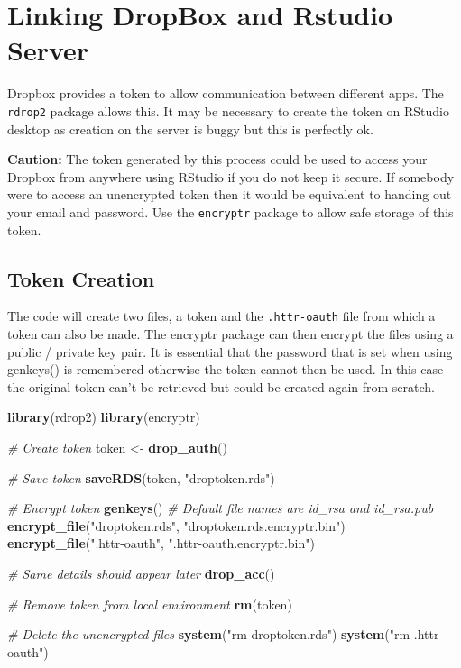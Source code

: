 \documentclass[]{book}
\newenvironment{Shaded}{\begin{snugshade}}{\end{snugshade}}
\newcommand{\CommentTok}[1]{\textcolor[rgb]{0.56,0.35,0.01}{\textit{#1}}}
\newcommand{\KeywordTok}[1]{\textcolor[rgb]{0.13,0.29,0.53}{\textbf{#1}}}
\newcommand{\NormalTok}[1]{#1}
\newcommand{\StringTok}[1]{\textcolor[rgb]{0.31,0.60,0.02}{#1}}
\begin{document}
\hypertarget{linking-dropbox-and-rstudio-server}{%
\section{Linking DropBox and Rstudio Server}\label{linking-dropbox-and-rstudio-server}}

Dropbox provides a token to allow communication between different apps. The \texttt{rdrop2} package allows this. It may be necessary to create the token on RStudio desktop as creation on the server is buggy but this is perfectly ok.

\textbf{Caution:} The token generated by this process could be used to access your Dropbox from anywhere using RStudio if you do not keep it secure. If somebody were to access an unencrypted token then it would be equivalent to handing out your email and password. Use the \texttt{encryptr} package to allow safe storage of this token.

\hypertarget{token-creation}{%
\subsection{Token Creation}\label{token-creation}}

The code will create two files, a token and the \texttt{.httr-oauth} file from which a token can also be made. The encryptr package can then encrypt the files using a public / private key pair. It is essential that the password that is set when using genkeys() is remembered otherwise the token cannot then be used. In this case the original token can't be retrieved but could be created again from scratch.

\begin{Shaded}
\begin{Highlighting}[]
\KeywordTok{library}\NormalTok{(rdrop2)}
\KeywordTok{library}\NormalTok{(encryptr)}
 
\CommentTok{# Create token}
\NormalTok{token <-}\StringTok{ }\KeywordTok{drop_auth}\NormalTok{()}
 
\CommentTok{# Save token}
\KeywordTok{saveRDS}\NormalTok{(token, }\StringTok{"droptoken.rds"}\NormalTok{)}
 
\CommentTok{# Encrypt token}
\KeywordTok{genkeys}\NormalTok{()               }\CommentTok{# Default file names are id_rsa and id_rsa.pub}
\KeywordTok{encrypt_file}\NormalTok{(}\StringTok{"droptoken.rds"}\NormalTok{, }\StringTok{"droptoken.rds.encryptr.bin"}\NormalTok{)}
\KeywordTok{encrypt_file}\NormalTok{(}\StringTok{".httr-oauth"}\NormalTok{, }\StringTok{".httr-oauth.encryptr.bin"}\NormalTok{)}
 
\CommentTok{# Same details should appear later}
\KeywordTok{drop_acc}\NormalTok{()}
 
\CommentTok{# Remove token from local environment}
\KeywordTok{rm}\NormalTok{(token)}
 
 
\CommentTok{# Delete the unencrypted files}
\KeywordTok{system}\NormalTok{(}\StringTok{"rm droptoken.rds"}\NormalTok{)}
\KeywordTok{system}\NormalTok{(}\StringTok{"rm .httr-oauth"}\NormalTok{)}
\end{Highlighting}
\end{Shaded}
\end{document}
